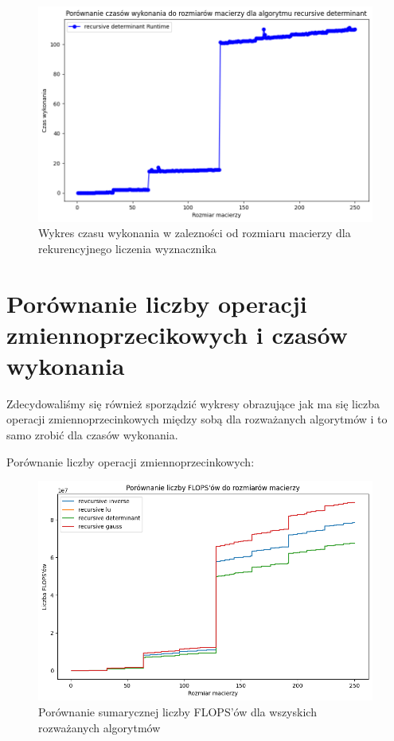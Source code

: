 \documentclass{article}
\begin{document}
\begin{figure}[H]
  \centering
    \includegraphics[width=0.99\textwidth]{images/determinant_time.png}
  \caption{Wykres czasu wykonania w zalezności od rozmiaru macierzy dla rekurencyjnego liczenia wyznacznika}
\end{figure}

\section{Porównanie liczby operacji zmiennoprzecikowych i czasów wykonania}

Zdecydowaliśmy się również sporządzić wykresy obrazujące jak ma się liczba operacji zmiennoprzecinkowych między sobą dla rozważanych algorytmów i to samo zrobić dla czasów wykonania.

\bigbreak

\noindent
Porównanie liczby operacji zmiennoprzecinkowych:

\begin{figure}[H]
  \centering
    \includegraphics[width=0.99\textwidth]{flops_comparison.png}
  \caption{Porównanie sumarycznej liczby FLOPS'ów dla wszyskich rozważanych algorytmów}
\end{figure}
\end{document}
